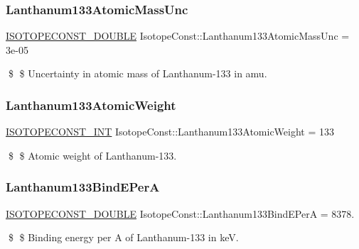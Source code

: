 \subsubsection{\texorpdfstring{Lanthanum133\+Atomic\+Mass\+Unc}{Lanthanum133AtomicMassUnc}}
{\footnotesize\ttfamily \mbox{\hyperlink{group___isotope_const-_macros_ga8f45a7272ce02c0b4c65c44636ed719a}{I\+S\+O\+T\+O\+P\+E\+C\+O\+N\+S\+T\+\_\+\+D\+O\+U\+B\+LE}} Isotope\+Const\+::\+Lanthanum133\+Atomic\+Mass\+Unc = 3e-\/05}

\$ \$ Uncertainty in atomic mass of Lanthanum-\/133 in amu. \mbox{\label{group___isotope_const-_lanthanum-_la133_ga5207aeebb047a9aedc4a2cad41315d3a}} 
\subsubsection{\texorpdfstring{Lanthanum133\+Atomic\+Weight}{Lanthanum133AtomicWeight}}
{\footnotesize\ttfamily \mbox{\hyperlink{group___isotope_const-_macros_ga5f18360b3e99483a35c32d789e62621c}{I\+S\+O\+T\+O\+P\+E\+C\+O\+N\+S\+T\+\_\+\+I\+NT}} Isotope\+Const\+::\+Lanthanum133\+Atomic\+Weight = 133}

\$ \$ Atomic weight of Lanthanum-\/133. \mbox{\label{group___isotope_const-_lanthanum-_la133_ga3ae8767b6177a56f078e03b646b40f1e}} 
\subsubsection{\texorpdfstring{Lanthanum133\+Bind\+E\+PerA}{Lanthanum133BindEPerA}}
{\footnotesize\ttfamily \mbox{\hyperlink{group___isotope_const-_macros_ga8f45a7272ce02c0b4c65c44636ed719a}{I\+S\+O\+T\+O\+P\+E\+C\+O\+N\+S\+T\+\_\+\+D\+O\+U\+B\+LE}} Isotope\+Const\+::\+Lanthanum133\+Bind\+E\+PerA = 8378.}

\$ \$ Binding energy per A of Lanthanum-\/133 in keV. \mbox{\label{group___isotope_const-_lanthanum-_la133_ga2eabaae4c250b14fd2b673bb55e26082}} 
